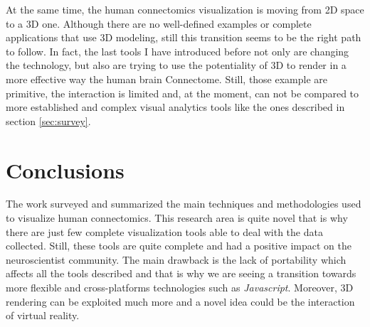 \documentclass{article}
\begin{document}
\begin{multicols}{2}
At the same time, the human connectomics visualization is moving from 2D space to a 3D one. Although there are no well-defined examples or complete applications that use 3D modeling, still this transition seems to be the right path to follow. In fact, the last tools I have introduced before not only are changing the technology, but also are trying to use the potentiality of 3D to render in a more effective way the human brain Connectome. Still, those example are primitive, the interaction is limited and, at the moment, can not be compared to more established and complex visual analytics tools like the ones described in section \ref{sec:survey}.

\section{Conclusions}
\label{sec:conclusions}

The work surveyed and summarized the main techniques and methodologies used to visualize human connectomics. This research area is quite novel that is why there are just few complete visualization tools able to deal with the data collected. Still, these tools are quite complete and had a positive impact on the neuroscientist community. The main drawback is the lack of portability which affects all the tools described and that is why we are seeing a transition towards more flexible and cross-platforms technologies such as \textit{Javascript}. Moreover, 3D rendering can be exploited much more and a novel idea could be the interaction of virtual reality.


{}
  





\end{multicols}
\end{document}
